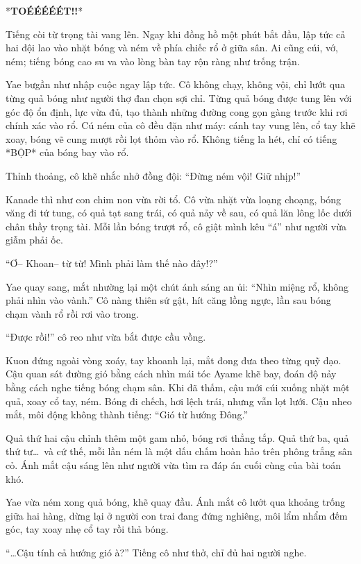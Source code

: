 \documentclass[../main.tex]{subfiles}
\begin{document}
\ct

*\textbf{TOÉÉÉÉÉT!!}*

Tiếng còi từ trọng tài vang lên. Ngay khi đồng hồ một phút bắt đầu, lập tức cả hai đội lao vào nhặt bóng và ném về phía chiếc rổ ở giữa sân. Ai cũng cúi, vớ, ném; tiếng bóng cao su va vào lòng bàn tay rộn ràng như trống trận.

Yae bưgần như nhập cuộc ngay lập tức. Cô không chạy, không vội, chỉ lướt qua từng quả bóng như người thợ đan chọn sợi chỉ. Từng quả bóng được tung lên với góc độ ổn định, lực vừa đủ, tạo thành những đường cong gọn gàng trước khi rơi chính xác vào rổ. Cú ném của cô đều đặn như máy: cánh tay vung lên, cổ tay khẽ xoay, bóng vẽ cung mượt rồi lọt thỏm vào rổ. Không tiếng la hét, chỉ có tiếng *BỘP* của bóng bay vào rổ.

Thỉnh thoảng, cô khẽ nhắc nhở đồng đội: ``Đừng ném vội! Giữ nhịp!''

Kanade thì như con chim non vừa rời tổ. Cô vừa nhặt vừa loạng choạng, bóng văng đi tứ tung, có quả tạt sang trái, có quả nảy về sau, có quả lăn lông lốc dưới chân thầy trọng tài. Mỗi lần bóng trượt rổ, cô giật mình kêu ``á'' như người vừa giẫm phải ốc.

``Ơ-- Khoan-- từ từ! Mình phải làm thế nào đây!?''

Yae quay sang, mắt nhường lại một chút ánh sáng an ủi: ``Nhìn miệng rổ, không phải nhìn vào vành.'' Cô nàng thiên sứ gật, hít căng lồng ngực, lần sau bóng chạm vành rổ rồi rơi vào trong.

``Được rồi!'' cô reo như vừa bắt được cầu vồng.

Kuon đứng ngoài vòng xoáy, tay khoanh lại, mắt đong đưa theo từng quỹ đạo. Cậu quan sát đường gió bằng cách nhìn mái tóc Ayame khẽ bay, đoán độ nảy bằng cách nghe tiếng bóng chạm sân. Khi đã thấm, cậu mới cúi xuống nhặt một quả, xoay cổ tay, ném. Bóng đi chếch, hơi lệch trái, nhưng vẫn lọt lưới. Cậu nheo mắt, môi động không thành tiếng: ``Gió từ hướng Đông.''

Quả thứ hai cậu chỉnh thêm một gam nhỏ, bóng rơi thẳng tắp. Quả thứ ba, quả thứ tư\dots\ và cứ thế, mỗi lần ném là một dấu chấm hoàn hảo trên phông trắng sân cỏ. Ánh mắt cậu sáng lên như người vừa tìm ra đáp án cuối cùng của bài toán khó.

Yae vừa ném xong quả bóng, khẽ quay đầu. Ánh mắt cô lướt qua khoảng trống giữa hai hàng, dừng lại ở người con trai đang đứng nghiêng, môi lẩm nhẩm đếm góc, tay xoay nhẹ cổ tay rồi thả bóng.

``\dots Cậu tính cả hướng gió à?'' Tiếng cô như thở, chỉ đủ hai người nghe.
\end{document}
